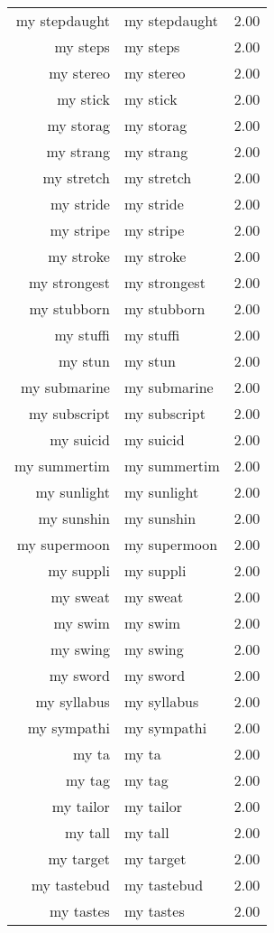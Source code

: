 \begin{table}[ht]
\begin{tabular}{rlr}
  my stepdaught & my stepdaught & 2.00 \\ 
  my steps & my steps & 2.00 \\ 
  my stereo & my stereo & 2.00 \\ 
  my stick & my stick & 2.00 \\ 
  my storag & my storag & 2.00 \\ 
  my strang & my strang & 2.00 \\ 
  my stretch & my stretch & 2.00 \\ 
  my stride & my stride & 2.00 \\ 
  my stripe & my stripe & 2.00 \\ 
  my stroke & my stroke & 2.00 \\ 
  my strongest & my strongest & 2.00 \\ 
  my stubborn & my stubborn & 2.00 \\ 
  my stuffi & my stuffi & 2.00 \\ 
  my stun & my stun & 2.00 \\ 
  my submarine & my submarine & 2.00 \\ 
  my subscript & my subscript & 2.00 \\ 
  my suicid & my suicid & 2.00 \\ 
  my summertim & my summertim & 2.00 \\ 
  my sunlight & my sunlight & 2.00 \\ 
  my sunshin & my sunshin & 2.00 \\ 
  my supermoon & my supermoon & 2.00 \\ 
  my suppli & my suppli & 2.00 \\ 
  my sweat & my sweat & 2.00 \\ 
  my swim & my swim & 2.00 \\ 
  my swing & my swing & 2.00 \\ 
  my sword & my sword & 2.00 \\ 
  my syllabus & my syllabus & 2.00 \\ 
  my sympathi & my sympathi & 2.00 \\ 
  my ta & my ta & 2.00 \\ 
  my tag & my tag & 2.00 \\ 
  my tailor & my tailor & 2.00 \\ 
  my tall & my tall & 2.00 \\ 
  my target & my target & 2.00 \\ 
  my tastebud & my tastebud & 2.00 \\ 
  my tastes & my tastes & 2.00 \\ 

\end{tabular}
\end{table}
